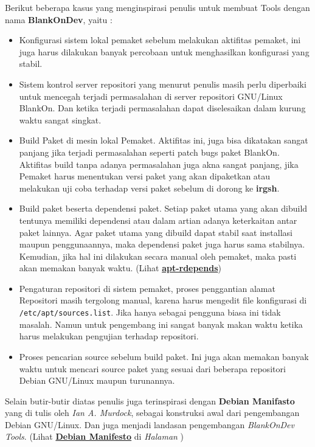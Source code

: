 \noindent
Berikut beberapa kasus yang menginspirasi penulis untuk membuat Tools dengan nama \textbf{BlankOnDev}, yaitu :
\begin{itemize}
	\item Konfigurasi sistem lokal pemaket sebelum melakukan aktifitas pemaket, ini juga harus dilakukan banyak percobaan untuk menghasilkan konfigurasi yang stabil.
	
	\item Sistem kontrol server repositori yang menurut penulis masih perlu diperbaiki untuk mencegah terjadi permasalahan di server repositori GNU/Linux BlankOn. Dan ketika terjadi permasalahan dapat diselesaikan dalam kurung waktu sangat singkat.
	
	\item Build Paket di mesin lokal Pemaket. Aktifitas ini, juga bisa dikatakan sangat panjang jika terjadi permasalahan seperti patch bugs paket BlankOn. Aktifitas build tanpa adanya permasalahan juga akna sangat panjang, jika Pemaket harus menentukan versi paket yang akan dipaketkan atau melakukan uji coba terhadap versi paket sebelum di dorong ke \textbf{irgsh}.
	
	\item Build paket beserta dependensi paket. Setiap paket utama yang akan dibuild tentunya memiliki dependensi atau dalam artian adanya keterkaitan antar paket lainnya. Agar paket utama yang dibuild dapat stabil saat installasi maupun penggunaannya, maka dependensi paket juga harus sama stabilnya. Kemudian, jika hal ini dilakukan secara manual oleh pemaket, maka pasti akan memakan banyak waktu. (Lihat \hyperref[text:apt-rdepends]{\textbf{apt-rdepends}})
	
	\pagebreak
	\item Pengaturan repositori di sistem pemaket, proses penggantian alamat Repositori masih tergolong manual, karena harus mengedit file konfigurasi di \texttt{/etc/apt/sources.list}. Jika hanya sebagai pengguna biasa ini tidak masalah. Namun untuk pengembang ini sangat banyak makan waktu ketika harus melakukan pengujian terhadap repositori.
	
	\item Proses pencarian source sebelum build paket. Ini juga akan memakan banyak waktu untuk mencari source paket yang sesuai dari beberapa repositori Debian GNU/Linux maupun turunannya.
\end{itemize}

\noindent
Selain butir-butir diatas penulis juga terinspirasi dengan \textbf{Debian Manifasto} yang di tulis oleh \textit{Ian A. Murdock}, sebagai konstruksi awal dari pengembangan Debian GNU/Linux. Dan juga menjadi landasan pengembangan \textit{BlankOnDev Tools}. (Lihat \hyperref[appdx::deb_manifesto]{\textbf{Debian Manifesto}} di \textit{Halaman \pageref{appdx::deb_manifesto}})


